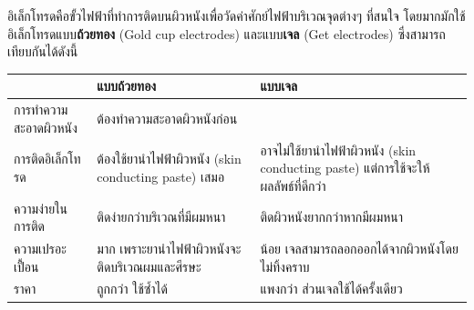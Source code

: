 อิเล็กโทรดคือขั้วไฟฟ้าที่ทำการติดบนผิวหนังเพื่อวัดค่าศักย์ไฟฟ้าบริเวณจุดต่างๆ ที่สนใจ โดยมากมักใช้อิเล็กโทรดแบบ\textbf{ถ้วยทอง}
(Gold cup electrodes) และแบบ\textbf{เจล} (Get electrodes) ซึ่งสามารถเทียบกันได้ดังนี้

\begin{table}[h]
    \begin{tabularx}{\textwidth}{l|X|X}
         & แบบถ้วยทอง & แบบเจล\\
        \hline
        การทำความสะอาดผิวหนัง  & \multicolumn{2}{l}{ต้องทำความสะอาดผิวหนังก่อน}\\
        \hline
        การติดอิเล็กโทรด & ต้องใช้ยานำไฟฟ้าผิวหนัง (skin conducting paste) เสมอ  & อาจไม่ใช้ยานำไฟฟ้าผิวหนัง (skin conducting paste) แต่การใช้จะให้ผลลัพธ์ที่ดีกว่า \\
        \hline
        ความง่ายในการติด & ติดง่ายกว่าบริเวณที่มีผมหนา & ติดผิวหนังยากกว่าหากมีผมหนา\\
        \hline
        ความเปรอะเปื้อน & มาก เพราะยานำไฟฟ้าผิวหนังจะติดบริเวณผมและศีรษะ & น้อย เจลสามารถลอกออกได้จากผิวหนังโดยไม่ทิ้งคราบ\\
        \hline
        ราคา & ถูกกว่า ใช้ซ้ำได้ & แพงกว่า ส่วนเจลใช้ได้ครั้งเดียว
    \end{tabularx}
\end{table}
